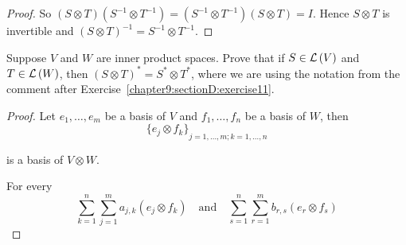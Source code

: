 \begin{proof}
    So $(S\otimes T)(S^{-1}\otimes T^{-1}) = (S^{-1}\otimes T^{-1})(S\otimes T) = I$. Hence $S\otimes T$ is invertible and ${(S\otimes T)}^{-1} = S^{-1}\otimes T^{-1}$.
\end{proof}
\newpage

\begin{exercise}\label{chapter9:sectionD:exercise11}
    Suppose $V$ and $W$ are inner product spaces. Prove that if $S\in\mathcal{L}\left({V}\right)$ and $T\in\mathcal{L}\left({W}\right)$, then ${(S\otimes T)}^{*} = S^{*}\otimes T^{*}$, where we are using the notation from the comment after Exercise~\ref{chapter9:sectionD:exercise11}.
\end{exercise}

\begin{proof}
    Let $e_{1}, \ldots, e_{m}$ be a basis of $V$ and $f_{1}, \ldots, f_{n}$ be a basis of $W$, then
    \[
        {\{e_{j}\otimes f_{k}\}}_{j=1,\ldots,m; k=1,\ldots,n}
    \]

    is a basis of $V\otimes W$.

    For every
    \[
        \sum^{n}_{k=1}\sum^{m}_{j=1}a_{j,k}(e_{j}\otimes f_{k})\quad\text{and}\quad\sum^{n}_{s=1}\sum^{m}_{r=1}b_{r,s}(e_{r}\otimes f_{s})
    \]


\end{proof}
